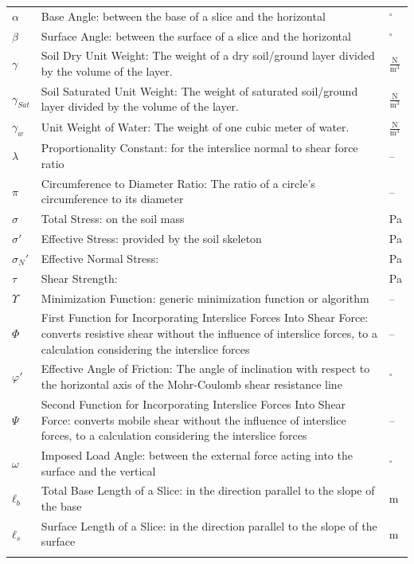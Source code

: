 \documentclass[12pt]{article}
\begin{document}
\begin{longtabu}{l X[l] l}
$α$ & Base Angle: between the base of a slice and the horizontal & ${}^{\circ}$
\\
$β$ & Surface Angle: between the surface of a slice and the horizontal & ${}^{\circ}$
\\
$γ$ & Soil Dry Unit Weight: The weight of a dry soil/ground layer divided by the volume of the layer. & $\frac{\text{N}}{\text{m}^{3}}$
\\
${γ_{Sat}}$ & Soil Saturated Unit Weight: The weight of saturated soil/ground layer divided by the volume of the layer. & $\frac{\text{N}}{\text{m}^{3}}$
\\
${γ_{w}}$ & Unit Weight of Water: The weight of one cubic meter of water. & $\frac{\text{N}}{\text{m}^{3}}$
\\
$λ$ & Proportionality Constant: for the interslice normal to shear force ratio & --
\\
$π$ & Circumference to Diameter Ratio: The ratio of a circle's circumference to its diameter & --
\\
$σ$ & Total Stress: on the soil mass & Pa
\\
$σ'$ & Effective Stress: provided by the soil skeleton & Pa
\\
${σ_{N}}'$ & Effective Normal Stress:  & Pa
\\
$τ$ & Shear Strength:  & Pa
\\
$Υ$ & Minimization Function: generic minimization function or algorithm & --
\\
$Φ$ & First Function for Incorporating Interslice Forces Into Shear Force: converts resistive shear without the influence of interslice forces, to a calculation considering the interslice forces & --
\\
$φ'$ & Effective Angle of Friction: The angle of inclination with respect to the horizontal axis of the Mohr-Coulomb shear resistance line & ${}^{\circ}$
\\
$Ψ$ & Second Function for Incorporating Interslice Forces Into Shear Force: converts mobile shear without the influence of interslice forces, to a calculation considering the interslice forces & --
\\
$ω$ & Imposed Load Angle: between the external force acting into the surface and the vertical & ${}^{\circ}$
\\
${ℓ_{b}}$ & Total Base Length of a Slice: in the direction parallel to the slope of the base & m
\\
${ℓ_{s}}$ & Surface Length of a Slice: in the direction parallel to the slope of the surface & m
\\
\bottomrule
\label{Table:ToS}
\end{longtabu}
\end{document}
